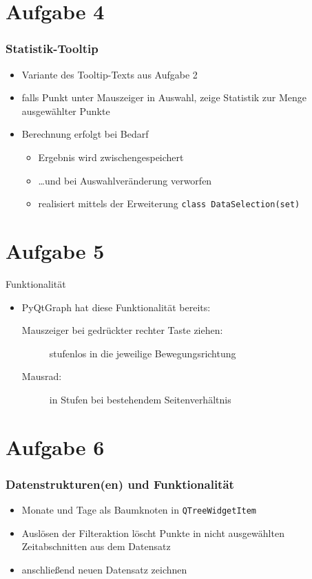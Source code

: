 \documentclass{beamer}
\begin{document}
    \section{Aufgabe 4}
    \begin{frame}[containsverbatim]
    	\frametitle{Statistik-Tooltip}
    	\begin{itemize}
    		\item Variante des Tooltip-Texts aus Aufgabe 2
    		\item falls Punkt unter Mauszeiger in Auswahl, zeige Statistik zur Menge ausgewählter Punkte
    		\item Berechnung erfolgt bei Bedarf
    			\begin{itemize}
    				\item Ergebnis wird zwischengespeichert
    				\item \ldots und bei Auswahlveränderung verworfen
    				\item realisiert mittels der Erweiterung \lstinline{class DataSelection(set)}
    			\end{itemize}
    	\end{itemize}
    \end{frame}

    \section{Aufgabe 5}
    \begin{frame}{Funktionalität}
    	\begin{itemize}
    		\setlength\itemsep{1em}
    		\item PyQtGraph hat diese Funktionalität bereits:
		  		\begin{description}
						\item[Mauszeiger bei gedrückter rechter Taste ziehen:] stufenlos in die jeweilige Bewegungsrichtung
						\item[Mausrad:] in Stufen bei bestehendem Seitenverhältnis
					\end{description}
    	\end{itemize}
    \end{frame}

    \section{Aufgabe 6}
    \begin{frame}
    	\frametitle{Datenstrukturen(en) und Funktionalität}
    	\begin{itemize}
    		\setlength\itemsep{1em}
    		\item Monate und Tage als Baumknoten in \lstinline{QTreeWidgetItem}
    		\item Auslösen der Filteraktion löscht Punkte in nicht ausgewählten Zeitabschnitten aus dem Datensatz
    		\item anschließend neuen Datensatz zeichnen
    	\end{itemize}
    \end{frame}
\end{document}
